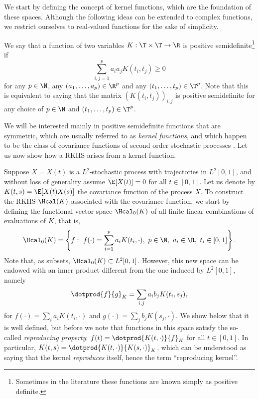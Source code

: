 We start by defining the concept of kernel functions, which are the foundation of these spaces. Although the following ideas can be extended to complex functions, we restrict ourselves to real-valued functions for the sake of simplicity.

\begin{definition}
  We say that a function of two variables \(K: \T \times \T \to \R\) is positive semidefinite\footnote{Sometimes in the literature these functions are known simply as positive definite.} if
  \[
    \sum_{i,j=1}^p a_ia_jK(t_i, t_j) \geq 0
  \]
  for any \(p\in\N\), any \((a_1,\dots, a_p)\in \R^p\) and any \((t_1,\dots, t_p)\in\T^p\). Note that this is equivalent to saying that the matrix \((K(t_i, t_j))_{i,j}\) is positive semidefinite for any choice of \(p\in\N\) and \((t_1,\dots, t_p)\in\T^p\).
\end{definition}

We will be interested mainly in positive semidefinite functions that are symmetric, which are usually referred to as \textit{kernel functions}, and which happen to be the class of covariance functions of second order stochastic processes \citep[][Th. 27]{berlinet2004reproducing}. Let us now show how a RKHS arises from a kernel function.

Suppose \(X=X(t)\) is a \(L^2\)-stochastic process with trajectories in \(L^2[0, 1]\), and without loss of generality assume \(\E[X(t)]=0\) for all \(t\in[0,1]\). Let us denote by \(K(t, s)= \E[X(t)X(s)]\) the covariance function of the process \(X\). To construct the RKHS \(\Hcal(K)\) associated with the covariance function, we start by defining the functional vector space \(\Hcal_0(K)\) of all finite linear combinations of evaluations of \(K\), that is,
\begin{equation}\label{eq:h0}
\Hcal_0(K) = \left\{ f: \ f(\cdot) = \sum_{i=1}^p a_i K(t_i, \cdot), \ p \in \N, \ a_i \in \R, \ t_i \in [0, 1] \right\}.
\end{equation}
Note that, as subsets, \(\Hcal_0(K)\subset L^2[0,1]\). However, this new space can be endowed with an inner product different from the one induced by \(L^2[0,1]\), namely
\[
\dotprod{f}{g}_K = \sum_{i, j} a_i b_j K(t_i, s_j),
\]
for \(f(\cdot)=\sum_i a_i K(t_i, \cdot) \) and \(g(\cdot)=\sum_j b_j K(s_j, \cdot)\). We show below that it is well defined, but before we note that functions in this space satisfy the so-called \textit{reproducing property}: \(f(t) = \dotprod{K(t, \cdot)}{f}_K\) for all \(t \in [0, 1]\). In particular, \(K(t, s)=\dotprod{K(t, \cdot)}{K(s, \cdot)}_K\), which can be understood as saying that the kernel \textit{reproduces} itself, hence the term ``reproducing kernel''.

